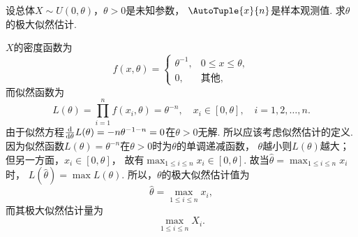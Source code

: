\begin{example}
设总体\(X \sim U(0,\theta)\)，\(\theta>0\)是未知参数，
\(\AutoTuple{x}{n}\)是样本观测值.
求\(\theta\)的极大似然估计.
\begin{solution}
\(X\)的密度函数为\[
f(x,\theta) = \left\{ \begin{array}{cl}
\theta^{-1}, & 0 \leq x \leq \theta, \\
0, & \text{其他},
\end{array} \right.
\]而似然函数为\[
L(\theta) = \prod_{i=1}^n{f(x_i,\theta)} = \theta^{-n},
\quad x_i \in [0,\theta], \quad i=1,2,\dotsc,n.
\]由于似然方程\(\dv{\theta} L(\theta) = -n\theta^{-1-n} = 0\)在\(\theta>0\)无解.
所以应该考虑似然估计的定义.
因为似然函数\(L(\theta)=\theta^{-n}\)在\(\theta>0\)时为\(\theta\)的单调递减函数，
\(\theta\)越小则\(L(\theta)\)越大；但另一方面，\(x_i\in[0,\theta]\)，
故有\(\max_{1 \leq i \leq n} x_i \in [0,\theta]\).
故当\(\hat{\theta}=\max_{1 \leq i \leq n} x_i\)时，
\(L(\hat{\theta})=\max L(\theta)\).
所以，\(\theta\)的极大似然估计值为\[
\hat{\theta} = \max_{1 \leq i \leq n} x_i,
\]而其极大似然估计量为\[
\max_{1 \leq i \leq n} X_i.
\]
\end{solution}
\end{example}
